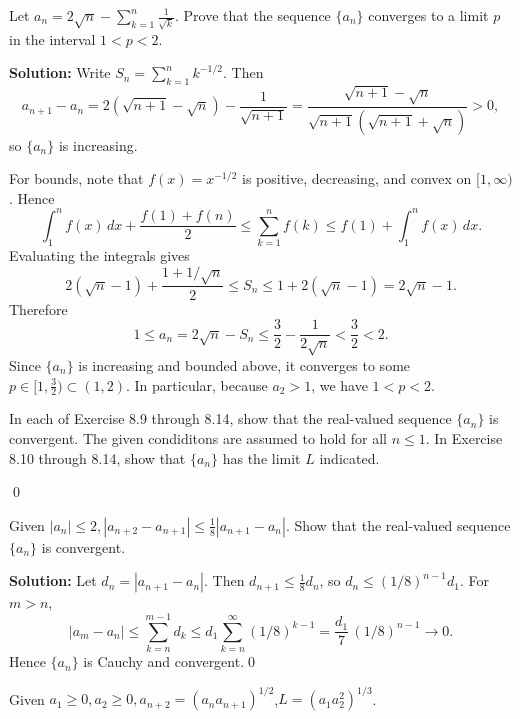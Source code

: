 \begin{problembox}
Let \(a_n = 2\sqrt{n}-\sum_{k=1}^n \frac{1}{\sqrt{k}}\). Prove that the sequence \(\{a_n\}\) converges to a limit \(p\) in the interval \(1 < p < 2\).
\end{problembox}

\noindent\textbf{Solution:}
Write \(S_n=\sum_{k=1}^n k^{-1/2}\). Then
\[a_{n+1}-a_n = 2(\sqrt{n+1}-\sqrt{n})-\frac{1}{\sqrt{n+1}} = \frac{\sqrt{n+1}-\sqrt{n}}{\sqrt{n+1}(\sqrt{n+1}+\sqrt{n})} > 0,\]
so \(\{a_n\}\) is increasing.

For bounds, note that \(f(x)=x^{-1/2}\) is positive, decreasing, and convex on \([1,\infty)\). Hence
\[\int_{1}^{n} f(x)\,dx + \frac{f(1)+f(n)}{2} \le \sum_{k=1}^{n} f(k) \le f(1)+\int_{1}^{n} f(x)\,dx.\]
Evaluating the integrals gives
\[2(\sqrt{n}-1)+\frac{1+1/\sqrt{n}}{2} \le S_n \le 1+2(\sqrt{n}-1)=2\sqrt{n}-1.\]
Therefore
\[1 \le a_n = 2\sqrt{n}-S_n \le \frac{3}{2}-\frac{1}{2\sqrt{n}} < \frac{3}{2} < 2.\]
Since \(\{a_n\}\) is increasing and bounded above, it converges to some \(p\in[1,\tfrac{3}{2})\subset(1,2)\). In particular, because \(a_2>1\), we have \(1<p<2\).



\begin{tcolorbox}[colback=red!10,colframe=red!50,arc=3pt,boxrule=1pt]
In each of Exercise 8.9 through 8.14, show that the real-valued sequence $\{a_n\}$ is convergent. The given condiditons are assumed to hold for all $n\leq 1$. In Exercise 8.10 through 8.14, show that $\{a_n\}$ has the limit $L$ indicated.
\end{tcolorbox}\qed


\begin{problembox}
Given \(|a_n| \leq 2, |a_{n+2} - a_{n+1}| \leq \frac{1}{8} |a_{n+1} - a_n|\). Show that the real-valued sequence \(\{a_n\}\) is convergent.
\end{problembox}

\noindent\textbf{Solution:}
Let \(d_n=|a_{n+1}-a_n|\). Then \(d_{n+1}\le \tfrac{1}{8}d_n\), so \(d_n\le (1/8)^{n-1} d_1\). For \(m>n\),
\[|a_m-a_n|\le \sum_{k=n}^{m-1} d_k \le d_1\sum_{k=n}^{\infty} (1/8)^{k-1}=\frac{d_1}{7}\,(1/8)^{n-1}\to 0.\]
Hence \(\{a_n\}\) is Cauchy and convergent.\qed


\begin{problembox}
Given \(a_1 \geq 0, a_2 \geq 0, a_{n+2} = (a_n a_{n+1})^{1/2}\),\(L = (a_1 a_2^2)^{1/3}\).
\end{problembox}

